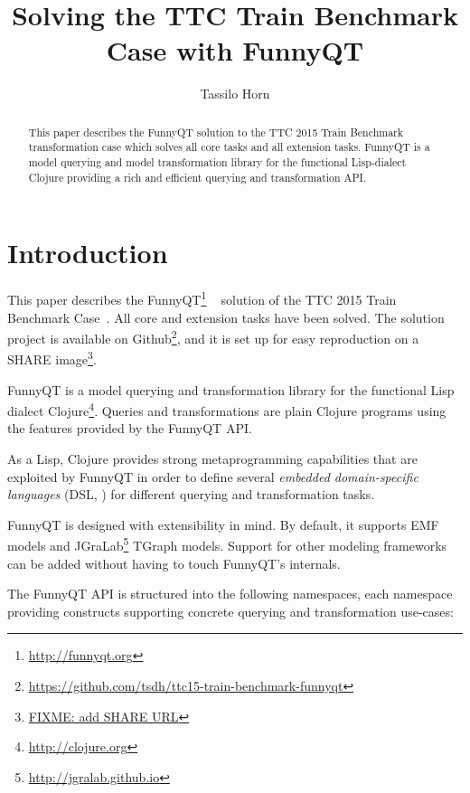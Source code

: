 \documentclass[submission]{eptcs}
\title{Solving the TTC Train Benchmark Case with FunnyQT}
\author{Tassilo Horn
  \institute{Institute for Software Technology, University Koblenz-Landau, Germany}
  \email{horn@uni-koblenz.de}}
\begin{document}
\maketitle

\begin{abstract}
  This paper describes the FunnyQT solution to the TTC 2015 Train Benchmark
  transformation case which solves all core tasks and all extension tasks.
  FunnyQT is a model querying and model transformation library for the
  functional Lisp-dialect Clojure providing a rich and efficient querying and
  transformation API.
\end{abstract}


\section{Introduction}
\label{sec:introduction}

This paper describes the FunnyQT\footnote{\url{http://funnyqt.org}}
~\cite{Horn2013MQWFQ} solution of the TTC 2015 Train Benchmark
Case~\cite{train-benchmark-case-desc}.  All core and extension tasks have been
solved.  The solution project is available on
Github\footnote{\url{https://github.com/tsdh/ttc15-train-benchmark-funnyqt}},
and it is set up for easy reproduction on a SHARE image\footnote{\url{FIXME:
    add SHARE URL}}.

FunnyQT is a model querying and transformation library for the functional Lisp
dialect Clojure\footnote{\url{http://clojure.org}}.  Queries and
transformations are plain Clojure programs using the features provided by the
FunnyQT API.

As a Lisp, Clojure provides strong metaprogramming capabilities that are
exploited by FunnyQT in order to define several \emph{embedded domain-specific
  languages} (DSL, \cite{book:Fowler2010DSL}) for different querying and
transformation tasks.

FunnyQT is designed with extensibility in mind.  By default, it supports EMF
\cite{Steinberg2008EEM} models and
JGraLab\footnote{\url{http://jgralab.github.io}} TGraph models.  Support for
other modeling frameworks can be added without having to touch FunnyQT's
internals.

The FunnyQT API is structured into the following namespaces, each namespace
providing constructs supporting concrete querying and transformation use-cases:
\end{document}

